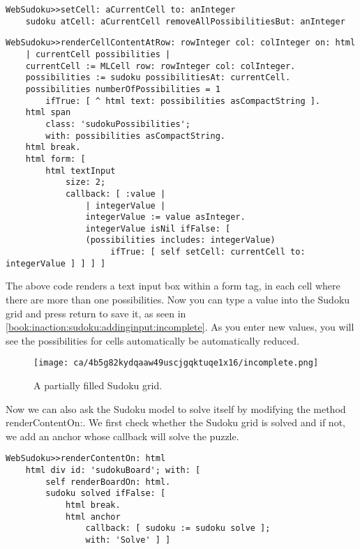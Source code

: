 \documentclass[a4paper,10pt,twoside]{book}
\newcommand{\ct}[1]{{\small\ttfamily\textup{#1}}}
\begin{document}
\begin{lstlisting}
WebSudoku>>setCell: aCurrentCell to: anInteger
    sudoku atCell: aCurrentCell removeAllPossibilitiesBut: anInteger
\end{lstlisting}

\begin{lstlisting}
WebSudoku>>renderCellContentAtRow: rowInteger col: colInteger on: html
    | currentCell possibilities |
    currentCell := MLCell row: rowInteger col: colInteger.
    possibilities := sudoku possibilitiesAt: currentCell.
    possibilities numberOfPossibilities = 1
        ifTrue: [ ^ html text: possibilities asCompactString ].
    html span 
        class: 'sudokuPossibilities';
        with: possibilities asCompactString.
    html break.
    html form: [
        html textInput 
            size: 2;
            callback: [ :value |
                | integerValue |
                integerValue := value asInteger.
                integerValue isNil ifFalse: [
                (possibilities includes: integerValue)
                     ifTrue: [ self setCell: currentCell to: integerValue ] ] ] ]
\end{lstlisting}

The above code renders a text input box within a form tag, in each cell where there are more than one possibilities. Now you can type a value into the Sudoku grid and press return to save it, as seen in \autoref{book:inaction:sudoku:addinginput:incomplete}. As you enter new values, you will see the possibilities for cells automatically be automatically reduced.

\begin{figure}[h!tbp]
	\begin{center}
		\texttt{[image: ca/4b5g82kydqaaw49uscjgqktuqe1x16/incomplete.png]}
		\caption{A partially filled Sudoku grid.\label{book:inaction:sudoku:addinginput:incomplete}}
	\end{center}
\end{figure}


Now we can also ask the Sudoku model to solve itself by modifying the method \ct{renderContentOn:}. We first check whether the Sudoku grid is solved and if not, we add an anchor whose callback will solve the puzzle.

\begin{lstlisting}
WebSudoku>>renderContentOn: html
    html div id: 'sudokuBoard'; with: [
        self renderBoardOn: html.
        sudoku solved ifFalse: [
            html break.
            html anchor
                callback: [ sudoku := sudoku solve ];
                with: 'Solve' ] ]
\end{lstlisting}
\end{document}

